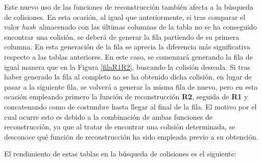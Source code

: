 \documentclass[12pt,spanish,listoffigures,listoftables,listofalgorithms]{tfgetsinf}
\newcommand{\hash}{\textit{hash}}
\begin{document}
Este nuevo uso de las funciones de reconstrucción también afecta a la búsqueda de colisiones. En esta ocasión, al igual que anteriormente, si tras comparar el valor \hash~almacenado con las últimas columnas de la tabla no se ha conseguido encontrar una colisión, se deberá de generar la fila partiendo de su primera columna. En esta generación de la fila se aprecia la diferencia más significativa respecto a las tablas anteriores. En este caso, se comenzará generando la fila de igual manera que en la Figura \ref{filaR1R2}, buscando la colisión deseada. Si tras haber generado la fila al completo no se ha obtenido dicha colisión, en lugar de pasar a la siguiente fila, se volverá a generar la misma fila de nuevo, pero en esta ocasión empleando primero la función de reconstrucción \textbf{R2}, seguida de \textbf{R1} y concatenando como de costumbre hasta llegar al final de la fila. El motivo por el cual ocurre esto es debido a la combinación de ambas funciones de reconstrucción, ya que al tratar de encontrar una colisión determinada, se desconoce qué función de reconstrucción ha sido empleada previo a su obtención.

El rendimiento de estas tablas en la búsqueda de colisiones es el siguiente:
\end{document}
